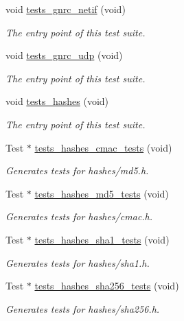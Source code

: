 \begin{DoxyCompactItemize}
void \hyperlink{group__unittests_gaa2175e6139cd4093cd5668926a58e869}{tests\+\_\+gnrc\+\_\+netif} (void)
\begin{DoxyCompactList}\small\item\em The entry point of this test suite. \end{DoxyCompactList}\item 
void \hyperlink{group__unittests_ga38d5edd024a05f621dcf3a505249ab59}{tests\+\_\+gnrc\+\_\+udp} (void)
\begin{DoxyCompactList}\small\item\em The entry point of this test suite. \end{DoxyCompactList}\item 
void \hyperlink{group__unittests_gac9c042435ff4e2597166100b86226d2a}{tests\+\_\+hashes} (void)
\begin{DoxyCompactList}\small\item\em The entry point of this test suite. \end{DoxyCompactList}\item 
Test $\ast$ \hyperlink{group__unittests_ga1a28ef20665a197204a84eb23688d340}{tests\+\_\+hashes\+\_\+cmac\+\_\+tests} (void)
\begin{DoxyCompactList}\small\item\em Generates tests for hashes/md5.\+h. \end{DoxyCompactList}\item 
Test $\ast$ \hyperlink{group__unittests_ga256959a65e4f795eac3581259fb3e48a}{tests\+\_\+hashes\+\_\+md5\+\_\+tests} (void)
\begin{DoxyCompactList}\small\item\em Generates tests for hashes/cmac.\+h. \end{DoxyCompactList}\item 
Test $\ast$ \hyperlink{group__unittests_ga5567d66422cdc40775eeacf6fa796893}{tests\+\_\+hashes\+\_\+sha1\+\_\+tests} (void)
\begin{DoxyCompactList}\small\item\em Generates tests for hashes/sha1.\+h. \end{DoxyCompactList}\item 
Test $\ast$ \hyperlink{group__unittests_ga8bd7d0c07950195a3b10d69ec62d0be2}{tests\+\_\+hashes\+\_\+sha256\+\_\+tests} (void)
\begin{DoxyCompactList}\small\item\em Generates tests for hashes/sha256.\+h. \end{DoxyCompactList}\item 

\end{DoxyCompactItemize}
